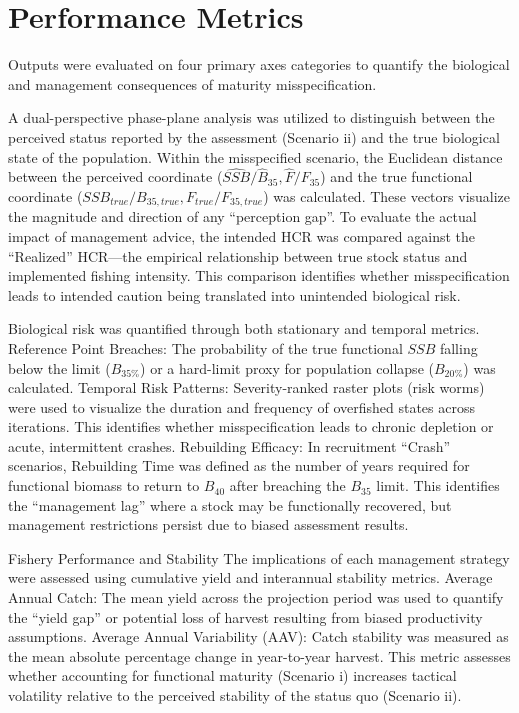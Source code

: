 \documentclass[
  authoryear,
  preprint,
  3p]{elsarticle}
\begin{document}
\section{Performance Metrics}\label{performance-metrics}

Outputs were evaluated on four primary axes categories to quantify the
biological and management consequences of maturity misspecification.

A dual-perspective phase-plane analysis was utilized to distinguish
between the perceived status reported by the assessment (Scenario ii)
and the true biological state of the population. Within the misspecified
scenario, the Euclidean distance between the perceived coordinate
(\(\hat{SSB}/\hat{B}_{35}, \hat{F}/F_{35}\)) and the true functional
coordinate (\(SSB_{true}/B_{35,true}, F_{true}/F_{35,true}\)) was
calculated. These vectors visualize the magnitude and direction of any
``perception gap''. To evaluate the actual impact of management advice,
the intended HCR was compared against the ``Realized'' HCR---the
empirical relationship between true stock status and implemented fishing
intensity. This comparison identifies whether misspecification leads to
intended caution being translated into unintended biological risk.

Biological risk was quantified through both stationary and temporal
metrics. Reference Point Breaches: The probability of the true
functional \(SSB\) falling below the limit (\(B_{35\%}\)) or a
hard-limit proxy for population collapse (\(B_{20\%}\)) was calculated.
Temporal Risk Patterns: Severity-ranked raster plots (risk worms) were
used to visualize the duration and frequency of overfished states across
iterations. This identifies whether misspecification leads to chronic
depletion or acute, intermittent crashes. Rebuilding Efficacy: In
recruitment ``Crash'' scenarios, Rebuilding Time was defined as the
number of years required for functional biomass to return to \(B_{40}\)
after breaching the \(B_{35}\) limit. This identifies the ``management
lag'' where a stock may be functionally recovered, but management
restrictions persist due to biased assessment results.

Fishery Performance and Stability The implications of each management
strategy were assessed using cumulative yield and interannual stability
metrics. Average Annual Catch: The mean yield across the projection
period was used to quantify the ``yield gap'' or potential loss of
harvest resulting from biased productivity assumptions. Average Annual
Variability (AAV): Catch stability was measured as the mean absolute
percentage change in year-to-year harvest. This metric assesses whether
accounting for functional maturity (Scenario i) increases tactical
volatility relative to the perceived stability of the status quo
(Scenario ii).
\end{document}
